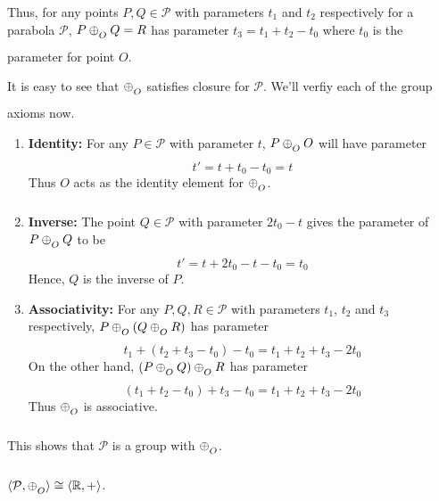Thus, for any points $P,Q\in\mathcal{P}$ with parameters $t_1$ and $t_2$
respectively for a parabola $\mathcal{P}$, $P \conop Q = R$ has parameter
$t_3 = t_1 + t_2 - t_0$ where $t_0$ is the parameter for point $O$.
\vspace{1ex}

It is easy to see that $\conop$ satisfies closure for $\mathcal{P}$. We'll verfiy
each of the group axioms now.

\begin{enumerate}
    \item{\textbf{Identity:}} For any $P\in\mathcal{P}$ with parameter $t$,
        $P \conop O$ will have parameter
        \[ t' = t + t_0 - t_0 = t \]
        Thus $O$ acts as the identity element for $\conop$.

    \item{\textbf{Inverse:}} The point $Q\in\mathcal{P}$ with parameter $2t_0 - t$
        gives the parameter of $P \conop Q$ to be
        \[ t' = t + 2t_0 - t - t_0 = t_0 \]
        Hence, $Q$ is the inverse of $P$.

    \item{\textbf{Associativity:}} For any $P,Q,R \in \mathcal{P}$ with parameters
        $t_1$, $t_2$ and $t_3$ respectively, $P\conop(Q \conop R)$ has parameter
        \[ t_1 + (t_2 + t_3 - t_0) - t_0 = t_1 + t_2 + t_3 - 2t_0 \]
        On the other hand, $(P \conop Q)\conop R$ has parameter
        \[ (t_1 + t_2 - t_0) + t_3 - t_0 = t_1 + t_2 + t_3 - 2t_0 \]
        Thus $\conop$ is associative.
\end{enumerate}

\noindent
This shows that $\mathcal{P}$ is a group with $\conop$.

\begin{theorem}
    $\langle \mathcal{P},\conop \rangle \cong \langle \mathbb{R},+ \rangle$.
\end{theorem}

